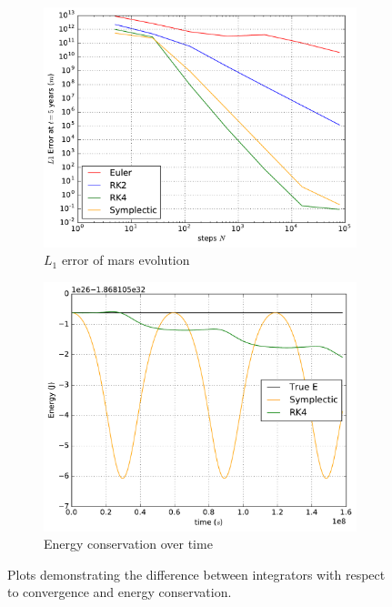 \documentclass[%
  ,paper=letter
  ,abstract=on
  ,DIV=calc
  ,toc=bib
]{scrartcl}
\begin{document}
\begin{figure}[h!]
\centering
\begin{subfigure}[t]{0.495\textwidth}
\includegraphics[width=\textwidth,keepaspectratio]{1_error}
\caption{$L_1$ error of mars evolution}
\label{fig:one}
\end{subfigure}
\begin{subfigure}[t]{0.495\textwidth}
\includegraphics[width=\textwidth,keepaspectratio]{1_rk4_energy}
\caption{Energy conservation over time}
\label{fig:two}
\end{subfigure}
\caption{Plots demonstrating the difference between integrators with respect to convergence and energy conservation.}
\label{fig:q1:plot}
\end{figure}
\end{document}
